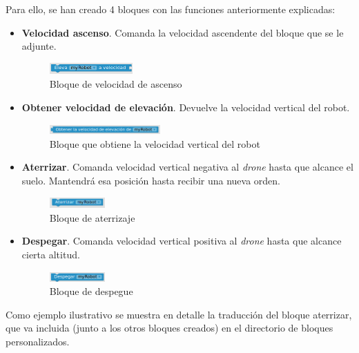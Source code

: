 Para ello, se han creado 4 bloques con las funciones anteriormente explicadas: 
\begin{itemize}
    \item \textbf{Velocidad ascenso}. Comanda la velocidad ascendente del bloque que se le adjunte. 
    \begin{figure}[H]
        \centering
        \includegraphics[width=0.3\textwidth]{img/ascensionBlockly.png}
        \caption{Bloque de velocidad de ascenso} \label{fig:ascension}
    \end{figure}
    
    \item \textbf{Obtener velocidad de elevación}. Devuelve la velocidad vertical del robot. 
    \begin{figure}[H]
        \centering
        \includegraphics[width=0.4\textwidth]{img/verticalBlockly.png}
        \caption{Bloque que obtiene la velocidad vertical del robot} \label{fig:vertical}
    \end{figure}
    \item \textbf{Aterrizar}. Comanda velocidad vertical negativa al \textit{drone} hasta que alcance el suelo. Mantendrá esa posición hasta recibir una nueva orden.
    \begin{figure}[H]
        \centering
        \includegraphics[width=0.2\textwidth]{img/aterrizarBlockly.png}
        \caption{Bloque de aterrizaje} \label{fig:aterrizaje}
    \end{figure}
    \item \textbf{Despegar}. Comanda velocidad vertical positiva al \textit{drone} hasta que alcance cierta altitud. 
        \begin{figure}[H]
            \centering
            \includegraphics[width=0.2\textwidth]{img/despegarBlockly.png}
            \caption{Bloque de despegue} \label{fig:despegar}
        \end{figure}
\end{itemize}

 Como ejemplo ilustrativo se muestra en detalle la traducción del bloque aterrizar, que va incluida (junto a los otros bloques creados) en el directorio de bloques personalizados.

